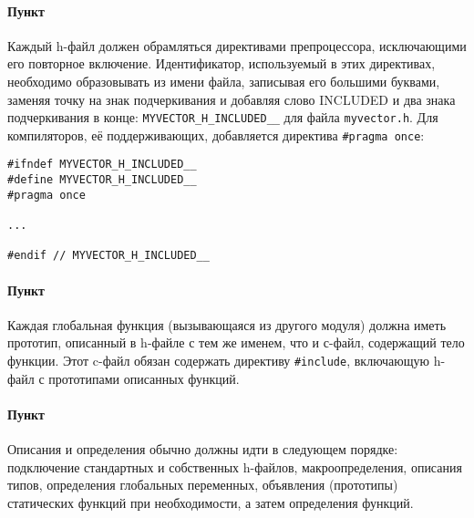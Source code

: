 \paragraph{Пункт}

Каждый h-файл должен обрамляться директивами препроцессора, исключающими
его повторное включение. Идентификатор, используемый в этих директивах,
необходимо образовывать из имени файла, записывая его большими буквами,
заменяя точку на знак подчеркивания и добавляя слово INCLUDED и два
знака подчеркивания в конце: \texttt{MYVECTOR\_H\_INCLUDED\_\_} для
файла \texttt{myvector.h}. Для компиляторов, её поддерживающих,
добавляется директива \texttt{\#pragma\ once}:

\begin{verbatim}
#ifndef MYVECTOR_H_INCLUDED__
#define MYVECTOR_H_INCLUDED__
#pragma once

...

#endif // MYVECTOR_H_INCLUDED__
\end{verbatim}

\paragraph{Пункт}

Каждая глобальная функция (вызывающаяся из другого модуля) должна иметь
прототип, описанный в h-файле с тем же именем, что и с-файл, содержащий
тело функции. Этот c-файл обязан содержать директиву \texttt{\#include},
включающую h-файл с прототипами описанных функций.

\paragraph{Пункт}

Описания и определения обычно должны идти в следующем порядке:
подключение стандартных и собственных h-файлов, макроопределения,
описания типов, определения глобальных переменных, объявления
(прототипы) статических функций при необходимости, а затем определения
функций.
